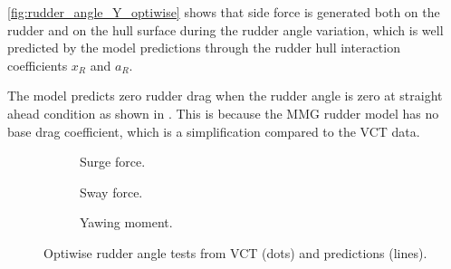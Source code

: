 \autoref{fig:rudder_angle_Y_optiwise} shows that side force is generated both on the rudder and on the hull surface during the rudder angle variation, which is well predicted by the model predictions through the rudder hull interaction coefficients $x_R$ and $a_R$. 

The model predicts zero rudder drag when the rudder angle is zero at straight ahead condition as shown in \label{fig:rudder_angle_X_optiwise}. This is because the MMG rudder model has no base drag coefficient, which is a simplification compared to the VCT data.
\begin{figure}[h]
     \centering
     \begin{subfigure}[b]{0.32\textwidth}
         \centering
         
        \caption{Surge force.}
        \label{fig:rudder_angle_X_optiwise}
     \end{subfigure}
     \hfill
     \begin{subfigure}[b]{0.32\textwidth}
         \centering
         
        \caption{Sway force.}
        \label{fig:rudder_angle_Y_optiwise}
     \end{subfigure}
     \hfill
     \begin{subfigure}[b]{0.32\textwidth}
         \centering
         
        \caption{Yawing moment.}
        \label{fig:rudder_angle_N_optiwise}
     \end{subfigure}
    \caption{Optiwise rudder angle tests from VCT (dots) and predictions (lines).}
    \label{fig:rudder_angle_optiwise}
\end{figure}

